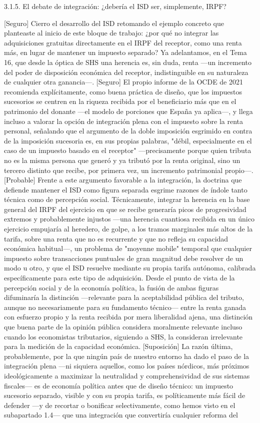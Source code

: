 \documentclass[10pt,a4paper]{article}
\begin{document}
3.1.5. El debate de integración: ¿debería el ISD ser, simplemente, IRPF?

[Seguro] Cierro el desarrollo del ISD retomando el ejemplo concreto que planteaste al inicio de este bloque de trabajo: ¿por qué no integrar las adquisiciones gratuitas directamente en el IRPF del receptor, como una renta más, en lugar de mantener un impuesto separado? Ya adelantamos, en el Tema 16, que desde la óptica de SHS una herencia es, sin duda, renta —un incremento del poder de disposición económica del receptor, indistinguible en su naturaleza de cualquier otra ganancia—. [Seguro] El propio informe de la OCDE de 2021 recomienda explícitamente, como buena práctica de diseño, que los impuestos sucesorios se centren en la riqueza recibida por el beneficiario más que en el patrimonio del donante —el modelo de porciones que España ya aplica—, y llega incluso a valorar la opción de integración plena con el impuesto sobre la renta personal, señalando que el argumento de la doble imposición esgrimido en contra de la imposición sucesoria es, en sus propias palabras, "débil, especialmente en el caso de un impuesto basado en el receptor" —precisamente porque quien tributa no es la misma persona que generó y ya tributó por la renta original, sino un tercero distinto que recibe, por primera vez, un incremento patrimonial propio—. [Probable] Frente a este argumento favorable a la integración, la doctrina que defiende mantener el ISD como figura separada esgrime razones de índole tanto técnica como de percepción social. Técnicamente, integrar la herencia en la base general del IRPF del ejercicio en que se recibe generaría picos de progresividad extremos y probablemente injustos —una herencia cuantiosa recibida en un único ejercicio empujaría al heredero, de golpe, a los tramos marginales más altos de la tarifa, sobre una renta que no es recurrente y que no refleja su capacidad económica habitual—, un problema de "moyenne mobile" temporal que cualquier impuesto sobre transacciones puntuales de gran magnitud debe resolver de un modo u otro, y que el ISD resuelve mediante su propia tarifa autónoma, calibrada específicamente para este tipo de adquisición. Desde el punto de vista de la percepción social y de la economía política, la fusión de ambas figuras difuminaría la distinción —relevante para la aceptabilidad pública del tributo, aunque no necesariamente para su fundamento técnico— entre la renta ganada con esfuerzo propio y la renta recibida por mera liberalidad ajena, una distinción que buena parte de la opinión pública considera moralmente relevante incluso cuando los economistas tributarios, siguiendo a SHS, la consideran irrelevante para la medición de la capacidad económica. [Suposición] La razón última, probablemente, por la que ningún país de nuestro entorno ha dado el paso de la integración plena —ni siquiera aquellos, como los países nórdicos, más próximos ideológicamente a maximizar la neutralidad y comprehensividad de sus sistemas fiscales— es de economía política antes que de diseño técnico: un impuesto sucesorio separado, visible y con su propia tarifa, es políticamente más fácil de defender —y de recortar o bonificar selectivamente, como hemos visto en el subapartado 1.4— que una integración que convertiría cualquier reforma del 
\end{document}
